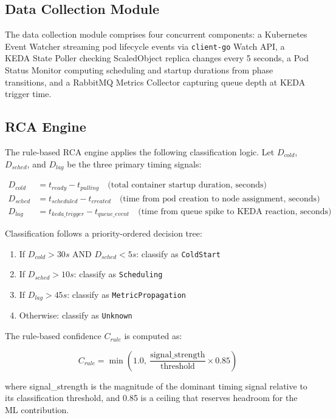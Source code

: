 \subsection{Data Collection Module}
The data collection module comprises four concurrent components: a Kubernetes Event Watcher streaming pod lifecycle events via \texttt{client-go} Watch API, a KEDA State Poller checking ScaledObject replica changes every 5 seconds, a Pod Status Monitor computing scheduling and startup durations from phase transitions, and a RabbitMQ Metrics Collector capturing queue depth at KEDA trigger time.

\subsection{RCA Engine}
The rule-based RCA engine applies the following classification logic. Let $D_{cold}$, $D_{sched}$, and $D_{lag}$ be the three primary timing signals:

\begin{align}
D_{cold} &= t_{ready} - t_{pulling} \quad \text{(total container startup duration, seconds)} \\
D_{sched} &= t_{scheduled} - t_{created} \quad \text{(time from pod creation to node assignment, seconds)} \\
D_{lag} &= t_{keda\_trigger} - t_{queue\_event} \quad \text{(time from queue spike to KEDA reaction, seconds)}
\end{align}

Classification follows a priority-ordered decision tree:

\begin{enumerate}
    \item If $D_{cold} > 30s$ AND $D_{sched} < 5s$: classify as \texttt{ColdStart}
    \item If $D_{sched} > 10s$: classify as \texttt{Scheduling}
    \item If $D_{lag} > 45s$: classify as \texttt{MetricPropagation}
    \item Otherwise: classify as \texttt{Unknown}
\end{enumerate}

The rule-based confidence $C_{rule}$ is computed as:

\begin{equation}
C_{rule} = \min\left(1.0,\ \frac{\text{signal\_strength}}{\text{threshold}} \times 0.85\right)
\end{equation}

where signal\_strength is the magnitude of the dominant timing signal relative to its classification threshold, and 0.85 is a ceiling that reserves headroom for the ML contribution.

